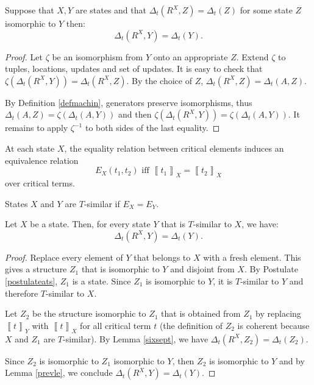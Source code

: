 \documentclass[envcountsame]{llncs}
\newcommand{\evaluation}[2][]{\ensuremath{\left\llbracket #2\right\rrbracket_{#1}}}
\newcommand{\val}[2]{\evaluation[#2]{#1}}
\newcommand{\gen}[1]{\Delta_t(#1)}
\begin{document}
\begin{lemma} \label{prevle}
Suppose that $X,Y$ are states and that $\gen{R^X,Z}=\gen{Z}$ for some
state $Z$ isomorphic to $Y$ then:
$$\gen{R^X,Y}=\gen{Y}.$$
\end{lemma}

\begin{proof}
Let $\zeta$ be an isomorphism from $Y$ onto an appropriate $Z$. Extend $\zeta$ to tuples,
locations, updates and set of updates. It is easy to check that $\zeta(\gen{R^X,Y}) = \gen{R^X,Z}$.
By the choice of $Z$, $\gen{R^X,Z} = \gen{A,Z}$.

By Definition \ref{defmachin}, generators preserve isomorphisms,
thus $\gen{A, Z} = \zeta(\gen{A, Y })$ and then $\zeta(\gen{R^X , Y}) = \zeta(\gen{A, Y})$.
It remains to apply $\zeta^{-1}$ to both sides of the last equality.
\end{proof}

At each state $X$, the equality relation between critical elements
induces an equivalence relation
$$E_X(t_1,t_2) \mbox{ iff } \val{t_1}{X}=\val{t_2}{X}$$
over critical terms.

States $X$ and $Y$ are $T$-similar if $E_X=E_Y$.

\begin{lemma}\label{lemma:lem62gur}
Let $X$ be a state. Then,  for every
state $Y$ that is  $T$-similar to $X$, we have:
$$\gen{R^X,Y}=\gen{Y}.$$
\end{lemma}

\begin{proof}
Replace every element of $Y$ that
belongs to $X$ with a fresh element. This gives a structure $Z_1$ that
is isomorphic to $Y$ and disjoint from $X$. By Postulate
\ref{postulateats}, $Z_1$ is a state. Since $Z_1$ is isomorphic to $Y$,
it is $T$-similar to $Y$ and therefore $T$-similar to $X$.

Let $Z_2$ be the structure isomorphic to $Z_1$ that is obtained
from $Z_1$ by replacing $\val{t}{Y}$ with $\val{t}{X}$ for all critical
term $t$ (the definition of $Z_2$ is coherent because $X$ and $Z_1$ are
$T$-similar). By Lemma \ref{sixsept}, we have $\gen{R^X,Z_2}=\gen{Z_2}$.

Since $Z_2$ is isomorphic to $Z_1$ isomorphic to $Y$, then $Z_2$ is isomorphic to $Y$
and by Lemma \ref{prevle}, we conclude $\gen{R^X,Y}=\gen{Y}$.
\end{proof}
\end{document}
